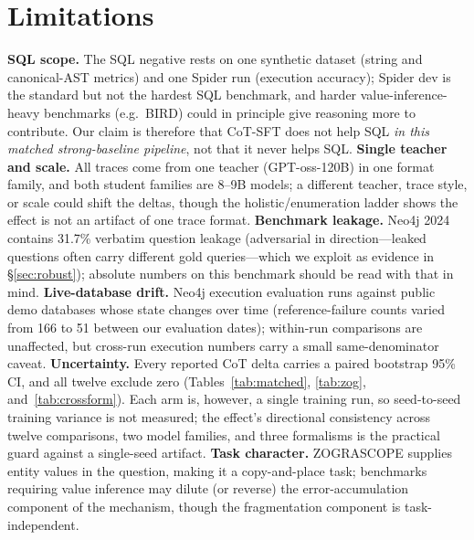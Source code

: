 \documentclass[11pt]{article}
\begin{document}
\section{Limitations}
\textbf{SQL scope.} The SQL negative rests on one synthetic dataset (string and canonical-AST
metrics) and one Spider run (execution accuracy); Spider dev is the standard but not the hardest SQL
benchmark, and harder value-inference-heavy benchmarks (e.g.\ BIRD) could in principle give
reasoning more to contribute. Our claim is therefore that CoT-SFT does not help SQL \emph{in this
matched strong-baseline pipeline}, not that it never helps SQL. \textbf{Single teacher and scale.} All traces come from
one teacher (GPT-oss-120B) in one format family, and both student families are 8--9B models; a
different teacher, trace style, or scale could shift the deltas, though the holistic/enumeration
ladder shows the effect is not an artifact of one trace format. \textbf{Benchmark leakage.} Neo4j
2024 contains 31.7\% verbatim question leakage (adversarial in direction---leaked questions often
carry different gold queries---which we exploit as evidence in \S\ref{sec:robust}); absolute numbers
on this benchmark should be read with that in mind. \textbf{Live-database drift.} Neo4j execution
evaluation runs against public demo databases whose state changes over time (reference-failure counts
varied from 166 to 51 between our evaluation dates); within-run comparisons are unaffected, but
cross-run execution numbers carry a small same-denominator caveat. \textbf{Uncertainty.} Every reported CoT delta carries a paired bootstrap 95\% CI, and all twelve
exclude zero (Tables~\ref{tab:matched}, \ref{tab:zog}, and~\ref{tab:crossform}). Each arm is,
however, a single training run, so seed-to-seed training variance is not measured; the effect's
directional consistency across twelve comparisons, two model families, and three
formalisms is the practical guard against a single-seed artifact. \textbf{Task character.} ZOGRASCOPE supplies entity values in the question,
making it a copy-and-place task; benchmarks requiring value inference may dilute (or reverse) the
error-accumulation component of the mechanism, though the fragmentation component is task-independent.

\end{document}
